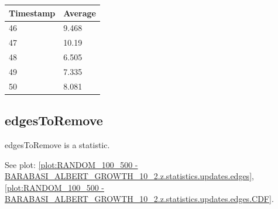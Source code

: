 \begin{tabular}{|l||l|}
\hline
	\textbf{Timestamp} & \textbf{Average} \\ \hline
	46 & 9.468 \\ \hline
	47 & 10.19 \\ \hline
	48 & 6.505 \\ \hline
	49 & 7.335 \\ \hline
	50 & 8.081 \\ \hline
\end{tabular}

\subsection{edgesToRemove}
edgesToRemove is a statistic.

See plot: \ref{plot:RANDOM_100_500 - BARABASI_ALBERT_GROWTH_10_2.z.statistics.updates.edges}, \ref{plot:RANDOM_100_500 - BARABASI_ALBERT_GROWTH_10_2.z.statistics.updates.edges.CDF}.

